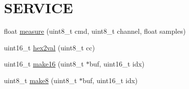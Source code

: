 \hypertarget{a00009}{\section{S\-E\-R\-V\-I\-C\-E}
\label{da/da0/a00009}
}








  


\begin{DoxyCompactItemize}
\item 
float \hyperlink{a00009_gac914ebaa64afce03ee852af09659cf69}{measure} (uint8\-\_\-t cmd, uint8\-\_\-t channel, float samples)
\begin{DoxyCompactList}\small\item\em 

 \end{DoxyCompactList}\end{DoxyCompactItemize}
\begin{DoxyCompactItemize}
\item 
uint16\-\_\-t \hyperlink{a00009_gab120dc4bec6b4097a5cd3ebb91131c57}{hex2val} (uint8\-\_\-t cc)
\begin{DoxyCompactList}\small\item\em 

 \end{DoxyCompactList}\end{DoxyCompactItemize}
\begin{DoxyCompactItemize}
\item 
uint16\-\_\-t \hyperlink{a00009_ga1e74920f34a07a82cca58eab71ed12b3}{make16} (uint8\-\_\-t $\ast$buf, uint16\-\_\-t idx)
\begin{DoxyCompactList}\small\item\em 

 \end{DoxyCompactList}\end{DoxyCompactItemize}
\begin{DoxyCompactItemize}
\item 
uint8\-\_\-t \hyperlink{a00009_gaefa26c3e5b22ccbe5de1c33305f20e1b}{make8} (uint8\-\_\-t $\ast$buf, uint16\-\_\-t idx)
\begin{DoxyCompactList}\small\item\em 

 \end{DoxyCompactList}\end{DoxyCompactItemize}


